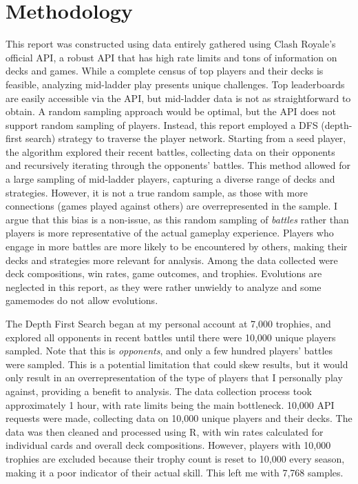 \documentclass{article}
\begin{document}
\section{Methodology}

This report was constructed using data entirely gathered using Clash Royale's official API, a robust API that has high rate limits and tons of information on decks and games. While a complete census of top players and their decks is feasible, analyzing mid-ladder play presents unique challenges. Top leaderboards are easily accessible via the API, but mid-ladder data is not as straightforward to obtain. A random sampling approach would be optimal, but the API does not support random sampling of players. Instead, this report employed a DFS (depth-first search) strategy to traverse the player network. Starting from a seed player, the algorithm explored their recent battles, collecting data on their opponents and recursively iterating through the opponents' battles. This method allowed for a large sampling of mid-ladder players, capturing a diverse range of decks and strategies. However, it is not a true random sample, as those with more connections (games played against others) are overrepresented in the sample. I argue that this bias is a non-issue, as this random sampling of \emph{battles} rather than players is more representative of the actual gameplay experience. Players who engage in more battles are more likely to be encountered by others, making their decks and strategies more relevant for analysis. Among the data collected were deck compositions, win rates, game outcomes, and trophies. Evolutions are neglected in this report, as they were rather unwieldy to analyze and some gamemodes do not allow evolutions. 

The Depth First Search began at my personal account at 7,000 trophies, and explored all opponents in recent battles until there were 10,000 unique players sampled. Note that this is \emph{opponents}, and only a few hundred players' battles were sampled. This is a potential limitation that could skew results, but it would only result in an overrepresentation of the type of players that I personally play against, providing a benefit to analysis. The data collection process took approximately 1 hour, with rate limits being the main bottleneck. 10,000 API requests were made, collecting data on 10,000 unique players and their decks. The data was then cleaned and processed using R, with win rates calculated for individual cards and overall deck compositions. However, players with 10,000 trophies are excluded because their trophy count is reset to 10,000 every season, making it a poor indicator of their actual skill. This left me with 7,768 samples.
\end{document}
